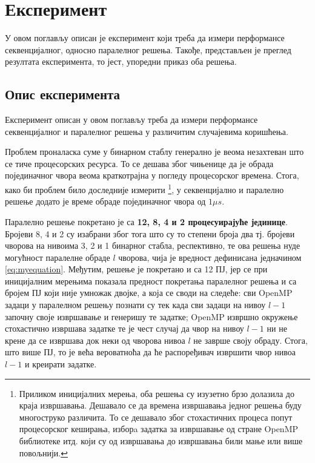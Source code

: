 \section{Експеримент}

У овом поглављу описан је експеримент који треба да измери перформансе секвенцијалног, односно паралелног решења.
Такође, представљен је преглед резултата експеримента, то јест, упоредни приказ оба решења.

\subsection{Опис експеримента}

Експеримент описан у овом поглављу треба да измери перформансе секвенцијалног и паралелног решења у различитим случајевима коришћења.

Проблем проналаска суме у бинарном стаблу генерално је веома незахтеван што се тиче процесорских ресурса.
То се дешава због чињенице да је обрада појединачног чвора веома краткотрајна у погледу процесорског времена.
Стога, како би проблем било доследније измерити
\footnote{Приликом иницијалних мерења, оба решења су изузетно брзо долазила до краја извршавања.
Дешавало се да времена извршавања једног решења буду многоструко различита.
То се дешавало због стохастичних процеса попут процесорског кеширања, изборa задатка за извршавање од стране OpenMP библиотеке итд.
који су од извршавања до извршавања били мање или више повољнији.},
у секвенцијално и паралелно решење додато је време обраде појединачног чвора од $1\mu s$.

Паралелно решење покретано је са \textbf{12, 8, 4 и 2 процесуирајуће јединице}.
Бројеви 8, 4 и 2 су изабрани због тога што су то степени броја два тј. бројеви чворова на нивоима 3, 2 и 1 бинарног стабла, респективно, те ова решења нуде
могућност паралелне обраде $l$ чворова, чија је вредност дефинисана једначином \ref{eq:myequation}.
Међутим, решење је покретано и са 12 ПЈ, јер се при иницијалним мерењима показала предност покретања паралелног решења
и са бројем ПЈ који није умножак двојке, а која се своди на следеће: сви OpenMP задаци у паралелном решењу познати су тек када сви задаци на нивоу $l-1$ започну
своје извршавање и генеришу те задатке; OpenMP извршно окружење стохастично извршава задатке те је чест случај да чвор на нивоу $l-1$ ни не крене да се извршава
док неки од чворова нивоа $l$ не заврше своју обраду. Стога, што више ПЈ, то је већа вероватноћа да ће распоређивач извршити чвор нивоа $l-1$ и креирати задатке.

